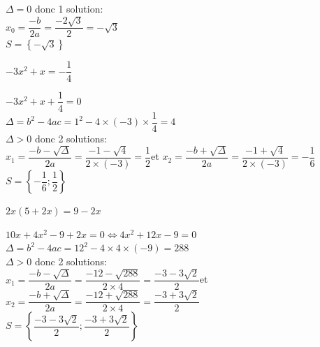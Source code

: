 \documentclass[11pt,a4paper]{article}  %
\begin{document}
\begin{enumMet}
\begin{corrBox}
		$\Delta=0$ donc 1 solution:\\
		$x_0=\dfrac{-b}{2a}=\dfrac{-2 \sqrt{3}}{2}=-\sqrt{3}$\\
		$S=\left\{-\sqrt{3}\right\}$
	\end{corrBox}
	\item $-3 x^2+x=-\dfrac{1}{4}$
	\begin{corrBox}
		$-3 x^2+x+\dfrac{1}{4}=0$\\
		$\Delta=b^2-4ac=1^2-4\times(-3)\times\dfrac{1}{4}=4$\\
		$\Delta>0$ donc 2 solutions:\\
		$x_1=\dfrac{-b-\sqrt{\Delta}}{2a}=\dfrac{-1-\sqrt{4}}{2\times (-3)}=\dfrac{1}{2}$\quad et \quad $x_2=\dfrac{-b+\sqrt{\Delta}}{2a}=\dfrac{-1+\sqrt{4}}{2\times (-3)}=-\dfrac{1}{6}$\\
		$S=\left\{-\dfrac{1}{6};\dfrac{1}{2}\right\}$
	\end{corrBox}
	\item $2 x(5+2 x)=9-2 x$
	\begin{corrBox}
		$10x+4x^2-9+2x=0\iff 4x^2+12x-9=0$\\
		$\Delta=b^2-4ac=12^2-4\times4\times(-9)=288$\\
		$\Delta>0$ donc 2 solutions:\\
		$x_1=\dfrac{-b-\sqrt{\Delta}}{2a}=\dfrac{-12-\sqrt{288}}{2\times 4}=\dfrac{-3-3\sqrt{2}}{2}$\quad et \quad $x_2=\dfrac{-b+\sqrt{\Delta}}{2a}=\dfrac{-12+\sqrt{288}}{2\times 4}=\dfrac{-3+3\sqrt{2}}{2}$\\
		$S=\left\{\dfrac{-3-3\sqrt{2}}{2};\dfrac{-3+3\sqrt{2}}{2}\right\}$
	\end{corrBox}
\end{enumMet}

\end{document}
